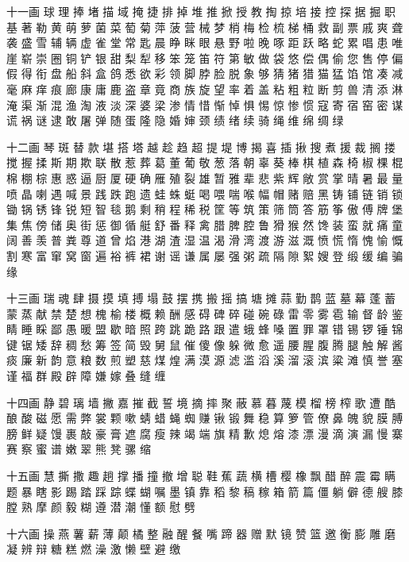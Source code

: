 {		十一画
		球 理 捧 堵 描 域 掩 捷 排 掉 堆 推 掀 授 教 掏 掠 培 接 控 探 据 掘
		职 基 著 勒 黄 萌 萝 菌 菜
		萄 菊 萍 菠 营 械 梦 梢 梅 检 梳 梯 桶 救 副 票 戚 爽 聋 袭 盛 雪 辅
		辆 虚 雀 堂 常 匙 晨 睁 眯
		眼 悬 野 啦 晚 啄 距 跃 略 蛇 累 唱 患 唯 崖 崭 崇 圈 铜 铲 银 甜 梨
		犁 移 笨 笼 笛 符 第 敏 做
		袋 悠 偿 偶 偷 您 售 停 偏 假 得 衔 盘 船 斜 盒 鸽 悉 欲 彩 领 脚 脖
		脸 脱 象 够 猜 猪 猎 猫 猛
		馅 馆 凑 减 毫 麻 痒 痕 廊 康 庸 鹿 盗 章 竟 商 族 旋 望 率 着 盖 粘
		粗 粒 断 剪 兽 清 添 淋 淹
		渠 渐 混 渔 淘 液 淡 深 婆 梁 渗 情 惜 惭 悼 惧 惕 惊 惨 惯 寇 寄 宿
		窑 密 谋 谎 祸 谜 逮 敢 屠
		弹 随 蛋 隆 隐 婚 婶 颈 绩 绪 续 骑 绳 维 绵 绸 绿
		
		十二画
		琴 斑 替 款 堪 搭 塔 越 趁 趋 超 提 堤 博 揭 喜 插 揪 搜 煮 援 裁 搁
		搂 搅 握 揉 斯 期 欺 联 散
		惹 葬 葛 董 葡 敬 葱 落 朝 辜 葵 棒 棋 植 森 椅 椒 棵 棍 棉 棚 棕 惠
		惑 逼 厨 厦 硬 确 雁 殖 裂
		雄 暂 雅 辈 悲 紫 辉 敞 赏 掌 晴 暑 最 量 喷 晶 喇 遇 喊 景 践 跌 跑
		遗 蛙 蛛 蜓 喝 喂 喘 喉 幅
		帽 赌 赔 黑 铸 铺 链 销 锁 锄 锅 锈 锋 锐 短 智 毯 鹅 剩 稍 程 稀 税
		筐 等 筑 策 筛 筒 答 筋 筝
		傲 傅 牌 堡 集 焦 傍 储 奥 街 惩 御 循 艇 舒 番 释 禽 腊 脾 腔 鲁 猾
		猴 然 馋 装 蛮 就 痛 童 阔
		善 羡 普 粪 尊 道 曾 焰 港 湖 渣 湿 温 渴 滑 湾 渡 游 滋 溉 愤 慌 惰
		愧 愉 慨 割 寒 富 窜 窝 窗
		遍 裕 裤 裙 谢 谣 谦 属 屡 强 粥 疏 隔 隙 絮 嫂 登 缎 缓 编 骗 缘
		
		十三画
		瑞 魂 肆 摄 摸 填 搏 塌 鼓 摆 携 搬 摇 搞 塘 摊 蒜 勤 鹊 蓝 墓 幕 蓬
		蓄 蒙 蒸 献 禁 楚 想 槐 榆
		楼 概 赖 酬 感 碍 碑 碎 碰 碗 碌 雷 零 雾 雹 输 督 龄 鉴 睛 睡 睬 鄙
		愚 暖 盟 歇 暗 照 跨 跳 跪
		路 跟 遣 蛾 蜂 嗓 置 罪 罩 错 锡 锣 锤 锦 键 锯 矮 辞 稠 愁 筹 签 简
		毁 舅 鼠 催 傻 像 躲 微 愈
		遥 腰 腥 腹 腾 腿 触 解 酱 痰 廉 新 韵 意 粮 数 煎 塑 慈 煤 煌 满 漠
		源 滤 滥 滔 溪 溜 滚 滨 粱
		滩 慎 誉 塞 谨 福 群 殿 辟 障 嫌 嫁 叠 缝 缠
		
		十四画
		静 碧 璃 墙 撇 嘉 摧 截 誓 境 摘 摔 聚 蔽 慕 暮 蔑 模 榴 榜 榨 歌 遭
		酷 酿 酸 磁 愿 需 弊 裳 颗
		嗽 蜻 蜡 蝇 蜘 赚 锹 锻 舞 稳 算 箩 管 僚 鼻 魄 貌 膜 膊 膀 鲜 疑 馒
		裹 敲 豪 膏 遮 腐 瘦 辣 竭
		端 旗 精 歉 熄 熔 漆 漂 漫 滴 演 漏 慢 寨 赛 察 蜜 谱 嫩 翠 熊 凳 骡
		缩
		
		十五画
		慧 撕 撒 趣 趟 撑 播 撞 撤 增 聪 鞋 蕉 蔬 横 槽 樱 橡 飘 醋 醉 震 霉
		瞒 题 暴 瞎 影 踢 踏 踩 踪
		蝶 蝴 嘱 墨 镇 靠 稻 黎 稿 稼 箱 箭 篇 僵 躺 僻 德 艘 膝 膛 熟 摩 颜
		毅 糊 遵 潜 潮 懂 额 慰 劈
		
		十六画
		操 燕 薯 薪 薄 颠 橘 整 融 醒 餐 嘴 蹄 器 赠 默 镜 赞 篮 邀 衡 膨 雕
		磨 凝 辨 辩 糖 糕 燃 澡 激
		懒 壁 避 缴
		
}
